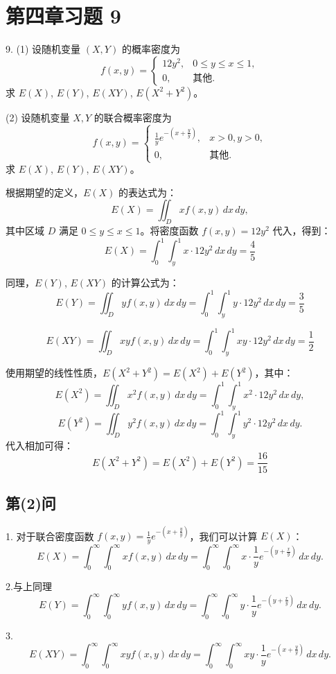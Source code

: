 \documentclass[twoside]{article}
\begin{document}
\section{第四章习题 9}

9. (1) 设随机变量 \( (X, Y) \) 的概率密度为
   \[
   f(x, y) = 
   \begin{cases}
      12y^2, & 0 \leq y \leq x \leq 1, \\
      0, & \text{其他}.
   \end{cases}
   \]
   求 \( E(X) \), \( E(Y) \), \( E(XY) \), \( E(X^2 + Y^2) \)。

   (2) 设随机变量 \( X, Y \) 的联合概率密度为
   \[
   f(x, y) = 
   \begin{cases}
      \frac{1}{y} e^{-(x + \frac{y}{y})}, & x > 0, y > 0, \\
      0, & \text{其他}.
   \end{cases}
   \]
   求 \( E(X) \), \( E(Y) \), \( E(XY) \)。

\begin{ans}{9}{9}

   根据期望的定义，\( E(X) \) 的表达式为：
   \[
   E(X) = \iint_{D} x f(x, y) \, dx \, dy,
   \]
   其中区域 \( D \) 满足 \( 0 \leq y \leq x \leq 1 \)。将密度函数 \( f(x, y) = 12y^2 \) 代入，得到：
   \[
   E(X) = \int_{0}^{1} \int_{y}^{1} x \cdot 12y^2 \, dx \, dy = \frac{4}{5}
   \]


   同理，\( E(Y) \), \( E(XY) \) 的计算公式为：
   \[
   E(Y) = \iint_{D} y f(x, y) \, dx \, dy = \int_{0}^{1} \int_{y}^{1} y \cdot 12y^2 \, dx \, dy = \frac{3}{5}
   \]

   \[
   E(XY) = \iint_{D} x y f(x, y) \, dx \, dy = \int_{0}^{1} \int_{y}^{1} x y \cdot 12y^2 \, dx \, dy = \frac{1}{2}
   \]

   使用期望的线性性质，\( E(X^2 + Y^2) = E(X^2) + E(Y^2) \)，其中：
   \[
   E(X^2) = \iint_{D} x^2 f(x, y) \, dx \, dy = \int_{0}^{1} \int_{y}^{1} x^2 \cdot 12y^2 \, dx \, dy,
   \]
   \[
   E(Y^2) = \iint_{D} y^2 f(x, y) \, dx \, dy = \int_{0}^{1} \int_{y}^{1} y^2 \cdot 12y^2 \, dx \, dy.
   \]
   代入相加可得：
   \[
   E(X^2 + Y^2) = E(X^2) + E(Y^2) = \frac{16}{15}
   \]

\subsection*{第(2)问}

    1.
   对于联合密度函数 \( f(x, y) = \frac{1}{y} e^{-(x + \frac{y}{y})} \)，我们可以计算 \( E(X) \)：
   \[
   E(X) = \int_{0}^{\infty} \int_{0}^{\infty} x f(x, y) \, dx \, dy = \int_{0}^{\infty} \int_{0}^{\infty} x \cdot \frac{1}{y} e^{-(y + \frac{x}{y})} \, dx \, dy.
   \]

    2.与上同理
   \[
   E(Y) = \int_{0}^{\infty} \int_{0}^{\infty} y f(x, y) \, dx \, dy = \int_{0}^{\infty} \int_{0}^{\infty} y \cdot \frac{1}{y} e^{-(y + \frac{x}{y})} \, dx \, dy.
   \]

    3.
   \[
   E(XY) = \int_{0}^{\infty} \int_{0}^{\infty} x y f(x, y) \, dx \, dy = \int_{0}^{\infty} \int_{0}^{\infty} x y \cdot \frac{1}{y} e^{-(x + \frac{y}{y})} \, dx \, dy.
   \]
\end{ans}
\end{document}
